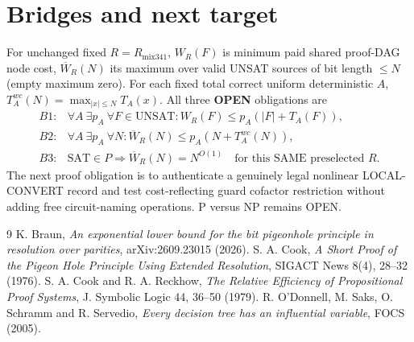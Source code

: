 \documentclass[11pt]{article}
\begin{document}
\section*{Bridges and next target}
For unchanged fixed $R=R_{\mathrm{mix341}}$, $W_R(F)$ is minimum paid shared proof-DAG node cost, $\overline W_R(N)$ its maximum over valid UNSAT sources of bit length $\le N$ (empty maximum zero). For each fixed total correct uniform deterministic $A$, $T_A^{wc}(N)=\max_{|x|\le N}T_A(x)$. All three \textbf{OPEN} obligations are
\[
\begin{array}{ll}
B1:&\forall A\ \exists p_A\ \forall F\in\mathrm{UNSAT}:
W_R(F)\le p_A(|F|+T_A(F)),\\
B2:&\forall A\ \exists p_A\ \forall N:
\overline W_R(N)\le p_A(N+T_A^{wc}(N)),\\
B3:&\mathrm{SAT}\in P\Longrightarrow\overline W_R(N)=N^{O(1)}
\quad\text{for this SAME preselected }R.
\end{array}
\]
The next proof obligation is to authenticate a genuinely legal nonlinear LOCAL-CONVERT record and test cost-reflecting guard cofactor restriction without adding free circuit-naming operations. P versus NP remains OPEN.
\begin{thebibliography}{9}
 K. Braun, \emph{An exponential lower bound for the bit pigeonhole principle in resolution over parities}, arXiv:2609.23015 (2026).
 S. A. Cook, \emph{A Short Proof of the Pigeon Hole Principle Using Extended Resolution}, SIGACT News 8(4), 28--32 (1976).
 S. A. Cook and R. A. Reckhow, \emph{The Relative Efficiency of Propositional Proof Systems}, J. Symbolic Logic 44, 36--50 (1979).
 R. O'Donnell, M. Saks, O. Schramm and R. Servedio, \emph{Every decision tree has an influential variable}, FOCS (2005).
\end{thebibliography}
\end{document}
